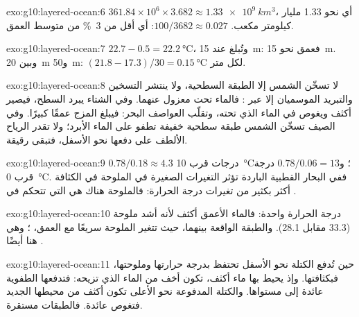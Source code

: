 \begin{solution}{exo:g10:layered-ocean:6}
$361.84\times10^6 \times 3.682 \approx \qty{1.33e9}{km^3}$، أي نحو
\num{1.33} مليار كيلومتر مكعب. $100/3682 \approx 0.027$: أي أقل من
\qty{3}{\percent} من متوسط العمق.
\end{solution}

\begin{solution}{exo:g10:layered-ocean:7}
$22.7 - 0.5 = \qty{22.2}{\degreeCelsius}$، وتُبلغ عند \qty{15}{m}: فعمق  نحو \qty{15}{m}. وبين \qty{20}{m} و\qty{50}{m}:
$(21.8 - 17.3)/30 = \qty{0.15}{\degreeCelsius}$ لكل متر.
\end{solution}

\begin{solution}{exo:g10:layered-ocean:8}
لا تسخّن الشمس إلا الطبقة السطحية، ولا ينتشر التسخين والتبريد الموسميان إلا عبر
: فالماء تحت  معزول عنهما. وفي الشتاء يبرد السطح،
فيصير أكثف ويغوص في الماء الذي تحته، وتقلّب العواصف البحر: فيبلغ المزج عمقًا كبيرًا.
وفي الصيف تسخّن الشمس طبقة سطحية خفيفة تطفو على الماء الأبرد؛ ولا تقدر الرياح الألطف
على دفعها نحو الأسفل، فتبقى  رقيقة.
\end{solution}

\begin{solution}{exo:g10:layered-ocean:9}
$0.78/0.18 \approx 4.3$ درجات قرب \qty{10}{\degreeCelsius}؛
و$0.78/0.06 = 13$ درجة قرب \qty{0}{\degreeCelsius}. ففي البحار القطبية الباردة
تؤثر التغيرات الصغيرة في الملوحة في الكثافة أكثر بكثير من تغيرات درجة الحرارة:
فالملوحة هناك هي التي تتحكم في .
\end{solution}

\begin{solution}{exo:g10:layered-ocean:10}
درجة الحرارة واحدة: فالماء الأعمق أكثف لأنه أشد ملوحة (33.3 مقابل 28.1). والطبقة
الواقعة بينهما، حيث تتغير الملوحة سريعًا مع العمق، ؛ وهي هنا أيضًا
.
\end{solution}

\begin{solution}{exo:g10:layered-ocean:11}
حين تُدفع الكتلة نحو الأسفل تحتفظ بدرجة حرارتها وملوحتها، فبكثافتها. وإذ يحيط بها
ماء أكثف، تكون أخف من الماء الذي تزيحه: فتدفعها الطفوية عائدة إلى مستواها. والكتلة
المدفوعة نحو الأعلى تكون أكثف من محيطها الجديد فتغوص عائدة. فالطبقات مستقرة.
\end{solution}

